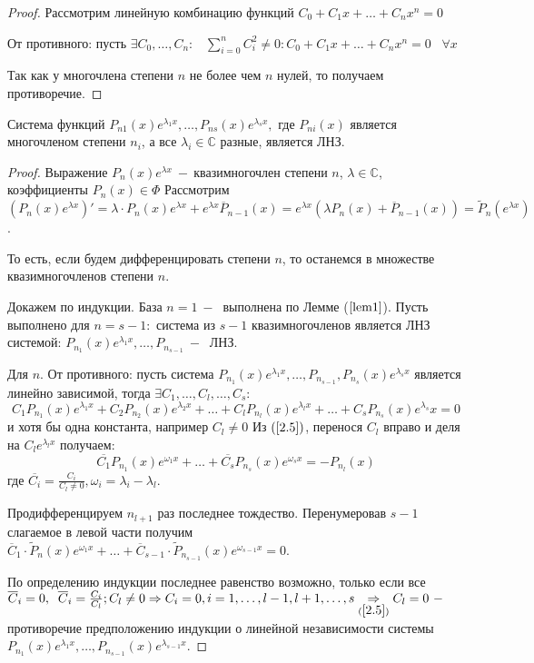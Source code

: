 \begin{proof}
Рассмотрим линейную комбинацию функций $C_0+C_1x+\dots+C_nx^n=0$\par От противного: пусть $\exists C_0, \dots, C_n:\;\;\;\displaystyle\sum_{i=0}^n C_i^2\neq0: C_0+C_1x+\dots+C_nx^n=0\;\;\;\forall x $\par Так как у многочлена степени $n$ не более чем $n$ нулей, то получаем противоречие.
\end{proof}
\begin{theorem}
Система функций $P_{n1}(x)e^{\lambda_1 x},\dots, P_{ns}(x)e^{\lambda_s x}, $ где $P_{ni}(x)$ является многочленом степени $n_i$,  а все $\lambda_i \in \mathds{C}$ разные,  является ЛНЗ.
\end{theorem}
\begin{proof}
Выражение $P_n(x)e^{\lambda x}~-~$квазимногочлен степени $n$, $\lambda\in\mathds{C}$, коэффициенты $P_n(
x)\in\varPhi$
Рассмотрим $(P_n(x)e^{\lambda x})'=\lambda\cdot P_n(x)e^{\lambda x}+e^{\lambda x}\overline{P}_{n-1}(x)=e^{\lambda x }(\lambda P_n(x)+\overline{P}_{n-1}(x))= \widetilde{P}_n(e^{\lambda x})$.\par То есть, если будем дифференцировать степени $n$, то останемся в множестве квазимногочленов степени $n$.\par
Докажем по индукции. База $n=1~-~$ выполнена по Лемме ($\ref{lem1}$). Пусть выполнено для $n=s-1:$ система из $s-1$ квазимногочленов является ЛНЗ системой: $P_{n_1}(x)e^{\lambda_1x}, \dots, P_{n_{s-1}}~-~$ ЛНЗ.\par
Для $n$. От противного: пусть система $P_{n_1}(x)e^{\lambda_1x}, \dots, P_{n_{s-1}}, P_{n_s}(x)e^{\lambda_s x}$ является линейно зависимой, тогда $\exists C_1, \dots, C_l, \dots, C_s:$
\begin{equation}
    \tag{2.5}
    \label{2.5}
    C_1P_{n_1}(x)e^{\lambda_1x}+C_2P_{n_2}(x)e^{\lambda_2x}+\dots+C_lP_{n_l}(x)e^{\lambda_lx}+\dots+C_sP_{n_s}(x)e^{\lambda_s}x=0
\end{equation}
и хотя бы одна константа, например $C_l\neq0$ Из $(\ref{2.5})$, перенося $C_l$ вправо и деля на $C_le^{\lambda_lx}$ получаем:
$$\overline{C_1}P_{n_1}(x)e^{\omega_1x}+\dots+\overline{C_s}P_{n_s}(x)e^{\omega_sx}=-P_{n_l}(x)$$ где $\overline{C_i}=\frac{C_i}{C_l\neq0}, \omega_i=\lambda_i-\lambda_l$.\par Продифференцируем $n_{l+1}$ раз последнее тождество. Перенумеровав $s-1$ слагаемое в левой части получим $\overline{C}_1\cdot \widetilde{P}_n(x)e^{\omega_1x}+\dots+\overline{C}_{s-1} \cdot \widetilde{P}_{n_{s-1}}(x)e^{\omega_{s-1}x}=0$.\par По определению индукции последнее равенство возможно, только если  все $\overline{C}_i=0, \;\;\overline{C}_i=\frac{C_i}{C_l};C_l\neq 0 \Rightarrow C_i =0, i=1, \dots, l-1, l+1, \dots, s\underset{(\ref{2.5})}{\Rightarrow} C_l=0~-~$ противоречие предположению индукции о линейной независимости системы $P_{n_1}(x)e^{\lambda_1x}, \dots, P_{n_{s-1}}(x)e^{\lambda_{s-1}x}$.
\end{proof}
